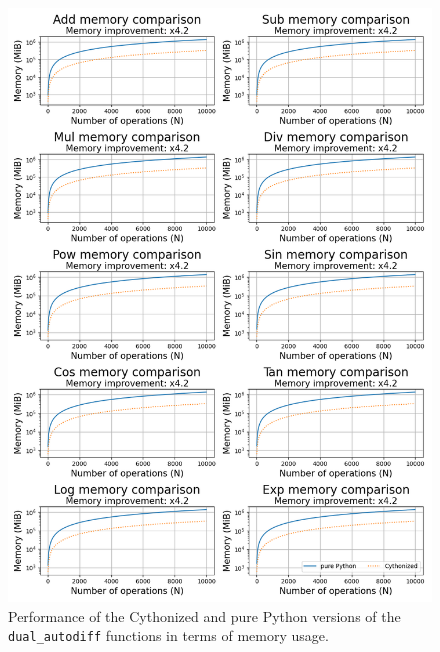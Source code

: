 \documentclass[11pt,a4paper]{article}
\begin{document}
\begin{figure}
    \centering
    \includegraphics[width=\columnwidth, keepaspectratio]{../memory.png}
    \caption{Performance of the Cythonized and pure Python versions of the \texttt{dual\_autodiff} functions in terms of memory usage.}
    \label{fig:memdiff}
\end{figure}
\end{document}
